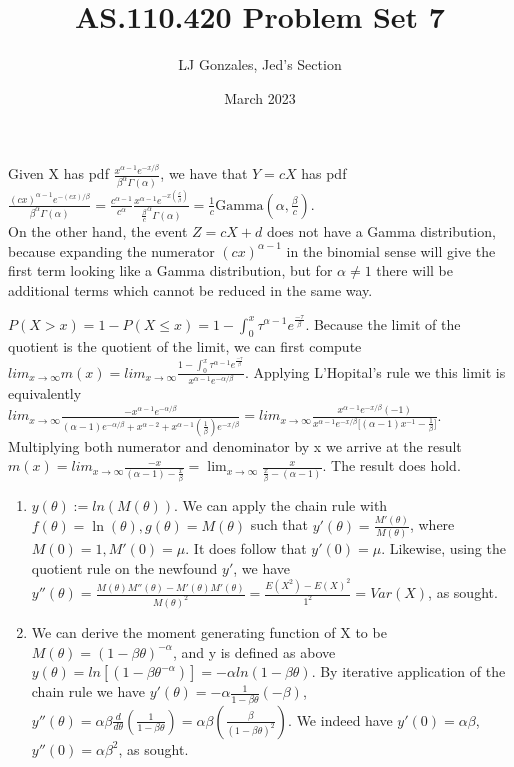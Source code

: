 \documentclass{article}
\title{AS.110.420 Problem Set 7}
\author{LJ Gonzales, Jed's Section}
\date{March 2023}
\begin{document}
\maketitle

\begin{prob}
Given X has pdf $\frac{x^{\alpha-1}e^{-x/\beta}}{\beta ^\alpha \Gamma(\alpha)}$, we have that $Y=cX$ has pdf  $\frac{(cx)^{\alpha-1}e^{-(cx)/\beta}}{\beta ^\alpha \Gamma(\alpha)}=\frac{c^{\alpha-1}}{c^\alpha}\frac{x^{\alpha-1}e^{-x(\frac{c}{\beta})}}{\frac{\beta}{c}^\alpha \Gamma(\alpha)} =\frac{1}{c}\text{Gamma}(\alpha,\frac{\beta}{c})$. \\
On the other hand, the event $Z=cX+d$ does not have a Gamma distribution, because expanding the numerator $(cx)^{\alpha-1}$ in the binomial sense will give the first term looking like a Gamma distribution, but for $\alpha \neq 1$ there will be additional terms which cannot be reduced in the same way.
\end{prob}

\begin{prob}
	$P(X > x)=1-P(X \leq x) = 1- \int^{x}_{0}\tau^{\alpha-1}e^{\frac{-\tau}{\beta}}$.
	Because the limit of the quotient is the quotient of the limit, we can first compute $lim_{x \to \infty}m(x) = lim_{x \to \infty}\frac{1- \int^{x}_{0}\tau^{\alpha-1}e^{\frac{-\tau}{\beta}}}{x^{\alpha-1}e^{-\alpha/\beta}}$.
	Applying L'Hopital's rule we this limit is equivalently $lim_{x \to \infty}\frac{-x^{\alpha -1}e^{-\alpha/\beta}}{(\alpha-1)e^{-\alpha/\beta}+x^{\alpha-2}+x^{\alpha-1}(\frac{1}{\beta})e^{-x/\beta}} = lim_{x \to \infty}\frac{x^{\alpha-1}e^{-x/\beta}(-1)}{x^{\alpha-1}e^{-x/\beta}\big[(\alpha-1)x^{-1}-\frac{1}{\beta}\big]}$.
	Multiplying both numerator and denominator by x we arrive at the result $m(x)=lim_{x \to \infty}\frac{-x}{(\alpha-1)-\frac{x}{\beta}}=\lim_{x \to \infty}\frac{x}{\frac{x}{\beta}-(\alpha-1)}$.
	The result does hold.
\end{prob}

\begin{prob}
	\begin{enumerate}
	\item $y(\theta):= ln(M(\theta))$. We can apply the chain rule with $f(\theta)=\ln(\theta), g(\theta)=M(\theta)$ such that $y'(\theta)=\frac{M'(\theta)}{M(\theta)}$, where $M(0)=1, M'(0)=\mu$. It does follow that $y'(0)=\mu$.
	Likewise, using the quotient rule on the newfound $y'$, we have $y''(\theta)=\frac{M(\theta)M''(\theta)-M'(\theta)M'(\theta)}{M(\theta)^2}=\frac{E(X^2)-E(X)^2}{1^2}=Var(X)$, as sought.

\item We can derive the moment generating function of X to be $M(\theta)=(1-\beta\theta)^{-\alpha}$, and y is defined as above $y(\theta)=ln[(1-\beta\theta^{-\alpha})]=-\alpha ln(1-\beta\theta)$.
	By iterative application of the chain rule we have $y'(\theta)=-\alpha\frac{1}{1-\beta\theta}(-\beta)$, $y''(\theta)=\alpha\beta\frac{d}{d\theta}(\frac{1}{1-\beta\theta})= \alpha\beta(\frac{\beta}{(1-\beta\theta)^2})$.
	We indeed have $y'(0)=\alpha\beta$, $y''(0)=\alpha\beta^2$, as sought.
	\end{enumerate}
\end{prob}
\end{document}
